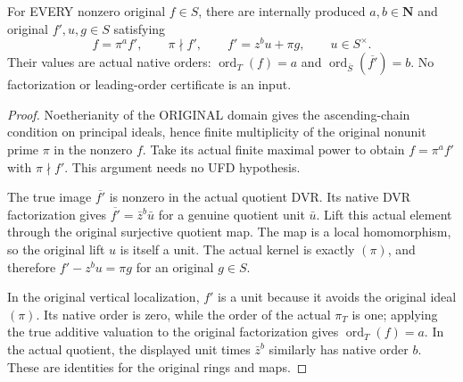 \begin{lemma}
\label{lem:gauss-surface-original-leading-expansion}
\leanok
\leavevmode\par
For EVERY nonzero original $f\in S$, there are internally produced
$a,b\in\mathbf N$ and original $f',u,g\in S$ satisfying
\[
 f=\pi^a f',\qquad \pi\nmid f',\qquad
 f'=z^b u+\pi g,\qquad u\in S^\times.
\]
Their values are actual native orders:
$\operatorname{ord}_T(f)=a$ and
$\operatorname{ord}_{\overline S}(\overline{f'})=b$.
No factorization or leading-order certificate is an input.
\end{lemma}
\begin{proof}
Noetherianity of the ORIGINAL domain gives the ascending-chain condition on
principal ideals, hence finite multiplicity of the original nonunit prime
$\pi$ in the nonzero $f$. Take its actual finite maximal power to obtain
$f=\pi^af'$ with $\pi\nmid f'$. This argument needs no UFD hypothesis.

The true image $\overline{f'}$ is nonzero in the actual quotient DVR.
Its native DVR factorization gives
$\overline{f'}=\bar z^b\bar u$ for a genuine quotient unit $\bar u$.
Lift this actual element through the original surjective quotient map.
The map is a local homomorphism, so the original lift $u$ is itself a unit.
The actual kernel is exactly $(\pi)$, and therefore
$f'-z^bu=\pi g$ for an original $g\in S$.

In the original vertical localization, $f'$ is a unit because it avoids
the original ideal $(\pi)$. Its native order is zero, while the order of
the actual $\pi_T$ is one; applying the true additive valuation to the
original factorization gives $\operatorname{ord}_T(f)=a$.
In the actual quotient, the displayed unit times $\bar z^b$ similarly has
native order $b$. These are identities for the original rings and maps.
\end{proof}


